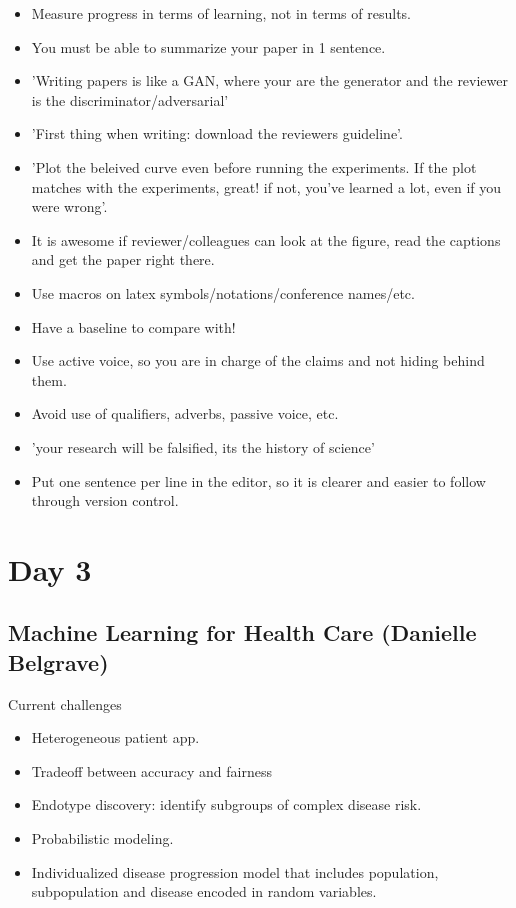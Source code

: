 \documentclass[12pt, english]{article}
\begin{document}
\begin{itemize}
  \item Measure progress in terms of learning, not in terms of results.
  \item You must be able to summarize your paper in 1 sentence.
  \item 'Writing papers is like a GAN, where your are the generator and the reviewer is the discriminator/adversarial'
  \item 'First thing when writing: download the reviewers guideline'.
  \item 'Plot the beleived curve even before running the experiments. If the plot matches with the experiments, great! if not, you've learned a lot, even if you were wrong'.
  \item It is awesome if reviewer/colleagues can look at the figure, read the captions and get the paper right there.
  \item Use macros on latex symbols/notations/conference names/etc.
  \item Have a baseline to compare with!
  \item Use active voice, so you are in charge of the claims and not hiding behind them.
  \item Avoid use of qualifiers, adverbs, passive voice, etc.
  \item 'your research will be falsified, its the history of science'
  \item Put one sentence per line in the editor, so it is clearer and easier to follow through version control.
\end{itemize}


\section{Day 3}

\subsection{Machine Learning for Health Care (Danielle Belgrave)}

Current challenges

\begin{itemize}
  \item Heterogeneous patient app.
  \item Tradeoff between accuracy and fairness
  \item Endotype discovery: identify subgroups of complex disease risk.
  \item Probabilistic modeling.
  \item Individualized disease progression model that includes population, subpopulation and disease encoded in random variables.
\end{itemize}
\end{document}
